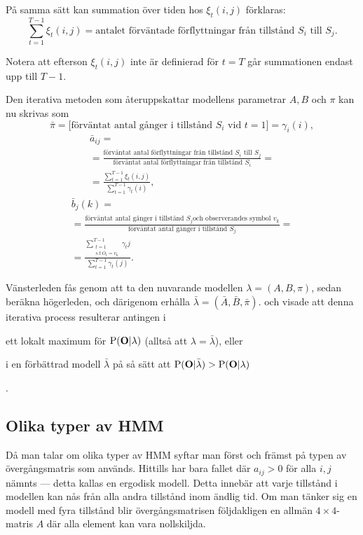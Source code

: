 \documentclass[../rapport_MVEX01-11-05]{subfiles}
\begin{document}
På samma sätt kan summation över tiden hos  $\xi_t(i,j)$ förklaras:
\begin{equation*}
\sum_{t=1}^{T-1}\xi_t(i,j) = \text{antalet förväntade förflyttningar
  från tillstånd $S_i$ till $S_j$}.
\end{equation*}

Notera att efterson $\xi_t(i,j)$ inte är definierad för $t=T$ går summationen 
endast upp till $T -1$. 

Den iterativa metoden som återuppskattar modellens parametrar $A,B$
och $\pi$ kan nu skrivas som
\begin{equation*}
\bar{\pi} = \text{[förväntat antal gånger i tillstånd $S_i$ vid
  $t=1$]} = \gamma_i(i),
\end{equation*}
\begin{multline*}
\bar{a}_{ij} = \\ = \frac{\text{förväntat antal förflyttningar från
    tillstånd $S_i$ till $S_j$}}{\text{förväntat antal förflyttningar
    från tillstånd $S_i$}} = \\ =
\frac{\sum_{t=1}^{T-1}\xi_t(i,j)}{\sum_{t=1}^{T-1}\gamma_t(i)},
\end{multline*}
\begin{multline*}
\bar{b}_j(k) = \\ = \frac{\text{förväntat antal gånger i tillstånd $S_j$
    och observerandes symbol $v_k$}}{\text{förväntat antal gånger i
    tillstånd $S_j$}} = \\ = \frac{\sum_{\substack{t=1\\s.t~ O_t =
      v_k}}^{T-1}\gamma_t{j}}{\sum_{t=1}^{T-1}\gamma_t(j)}.
\end{multline*}

Vänsterleden fås genom att ta den nuvarande modellen $\lambda =
(A,B,\pi)$, sedan beräkna högerleden, och därigenom erhålla $\bar{\lambda} =
(\bar{A},\bar{B}, \bar{\pi})$.  och 
visade att denna iterativa process resulterar antingen i
\begin{inparaenum}
	\item ett lokalt maximum för $\mathrm{P}(\mathbf{O}|\lambda)$
  (alltså att $\lambda = \bar{\lambda}$), eller
 	\item i en förbättrad modell $\bar{\lambda}$ på så sätt att
  $\mathrm{P}(\mathbf{O}|\bar{\lambda}) > \mathrm{P}(\mathbf{O}|\lambda)$
\end{inparaenum}. 

\subsection{Olika typer av HMM}
Då man talar om olika typer av HMM syftar man först och främst på
typen av övergångsmatris som används. Hittills har bara 
fallet där $a_{ij} > 0$ för alla $i,j$ nämnts --- detta kallas en ergodisk
modell. Detta innebär att varje tillstånd i modellen
kan nås från alla andra tillstånd inom ändlig tid. Om man
tänker sig en modell med fyra tillstånd blir övergångsmatrisen
följdakligen en allmän $4\times 4$-matris $A$ där alla element kan vara nollskiljda.
\end{document}
